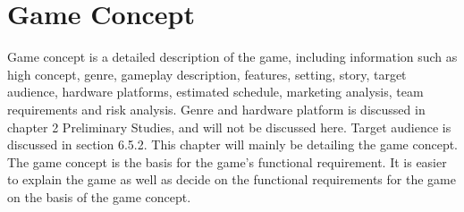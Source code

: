 \chapter{Game Concept}
\label{chap:gameconsept}

	Game concept is a detailed description of the game, including information such as high concept,
	genre, gameplay description, features, setting, story, target audience, hardware platforms,
	estimated schedule, marketing analysis, team requirements and risk analysis. \cite{gameConcept}
	Genre and hardware platform is discussed in chapter 2 Preliminary Studies, and will not be
	discussed here. Target audience is discussed in section 6.5.2. This chapter will mainly be
	detailing the game concept. The game concept is the basis for the game's functional requirement.
	It is easier to explain the game as well as decide on the functional requirements for the game
	on the basis of the game concept.
